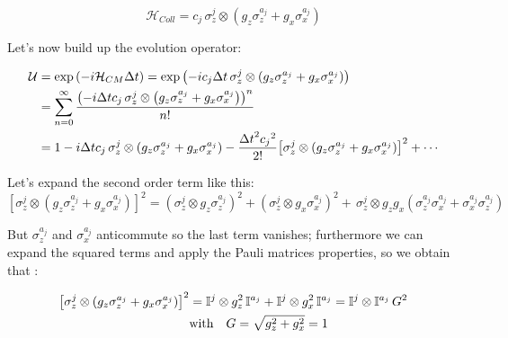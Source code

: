 \documentclass[a4paper,12pt]{article}
\begin{document}
	\begin{equation}
		\mathcal{H}_{Coll} = c_{j} \, \sigma_{z}^{j} \otimes \left(g_{z} \sigma_{z}^{a_j} + g_{x} \sigma_{x}^{a_j} \right)
		\label{eq:H_coll_int}
	\end{equation}

	Let's now build up the evolution operator:

	\begin{align}
		\mathcal{U} &= \exp{\left( -i \mathcal{H}_{CM} \Delta t \right)} = \exp{\left( -i c_{j} \Delta t \, \sigma_{z}^{j} \otimes \left(g_{z} \sigma_{z}^{a_j} + g_{x} \sigma_{x}^{a_j} \right) \right)} \\
		&= \sum_{n=0}^{\infty}{\frac{\left(-i \Delta t c_{j} \, \sigma_{z}^{j} \otimes \left(g_{z} \sigma_{z}^{a_j} + g_{x} \sigma_{x}^{a_j} \right) \right)^n}{n!}} \\
		&= 1 - i \Delta t c_{j} \, \sigma_{z}^{j} \otimes \left(g_{z} \sigma_{z}^{a_j} + g_{x} \sigma_{x}^{a_j} \right) - \frac{{\Delta t}^{2} {c_j}^{2}}{2!} {\left[\sigma_{z}^{j} \otimes \left(g_{z} \sigma_{z}^{a_j} + g_{x} \sigma_{x}^{a_j} \right)\right]}^{2} + \cdots \notag
	\end{align}

	Let's expand the second order term like this:
	\begin{equation}
		{\left[\sigma_{z}^{j} \otimes \left(g_{z} \sigma_{z}^{a_j} + g_{x} \sigma_{x}^{a_j} \right)\right]}^{2} = {\left(\sigma_{z}^{j} \otimes g_{z} \sigma_{z}^{a_j} \right)}^{2} + {\left(\sigma_{z}^{j} \otimes g_{x} \sigma_{x}^{a_j} \right)}^{2} + \, \sigma_{z}^{j} \otimes g_{z}g_{x}\left( \sigma_{z}^{a_j}\sigma_{x}^{a_j} + \sigma_{x}^{a_j}\sigma_{z}^{a_j} \right)
	\end{equation}

	\begin{flushleft}
		But $ \sigma_{z}^{a_j} $ and $ \sigma_{x}^{a_j} $ anticommute so the last term vanishes; furthermore we can expand the squared terms and apply the Pauli matrices properties, so we obtain that :
	\end{flushleft}

	\begin{align}
		{\left[\sigma_{z}^{j} \otimes \left(g_{z} \sigma_{z}^{a_j} + g_{x} \sigma_{x}^{a_j} \right)\right]}^{2} &= \mathbb{I}^{j} \otimes g_{z}^{2} \, \mathbb{I}^{a_j} + \mathbb{I}^{j} \otimes g_{x}^{2} \, \mathbb{I}^{a_j}
		= \mathbb{I}^{j} \otimes \mathbb{I}^{a_j} \, G^{2} \\
		& \text{with} \quad G = \sqrt{g_{z}^{2} + g_{x}^{2}} =1 \notag
		\label{eq:G_def}
	\end{align}
\end{document}
